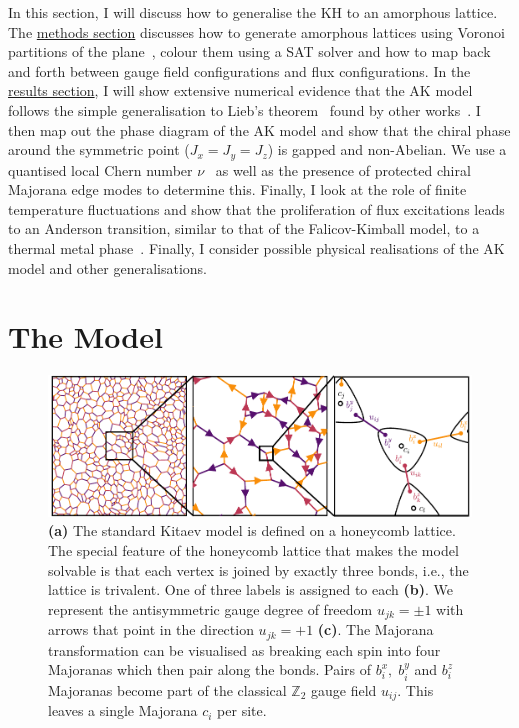 In this section, I will discuss how to generalise the KH to an amorphous lattice. The \protect\hyperlink{amk-methods}{methods section} discusses how to generate amorphous lattices using Voronoi partitions of the plane~\autocite{mitchellAmorphousTopologicalInsulators2018,marsalTopologicalWeaireThorpeModels2020}, colour them using a SAT solver and how to map back and forth between gauge field configurations and flux configurations. In the \protect\hyperlink{amk-results}{results section}, I will show extensive numerical evidence that the AK model follows the simple generalisation to Lieb's theorem~\autocite{lieb_flux_1994} found by other works~\autocite{eschmannThermodynamicClassificationThreedimensional2020,Yao2009,eschmann2019thermodynamics,Peri2020}. I then map out the phase diagram of the AK model and show that the chiral phase around the symmetric point (\(J_x = J_y = J_z\)) is gapped and non-Abelian. We use a quantised local Chern number \(\nu\)~\autocite{peru_preprint,mitchellAmorphousTopologicalInsulators2018} as well as the presence of protected chiral Majorana edge modes to determine this. Finally, I look at the role of finite temperature fluctuations and show that the proliferation of flux excitations leads to an Anderson transition, similar to that of the Falicov-Kimball model, to a thermal metal phase~\autocite{Laumann2012,lahtinenTopologicalLiquidNucleation2012,selfThermallyInducedMetallic2019}. Finally, I consider possible physical realisations of the AK model and other generalisations.

\hypertarget{amk-Model}{%
\section{The Model}\label{amk-Model}}

\hypertarget{fig:amk-zoom}{%
\begin{figure}
\centering
\includegraphics[width=1\textwidth,height=\textheight]{figure_code/amk_chapter/intro/amk_zoom/amk_zoom_by_hand}
\caption[{The Kitaev Honeycomb Model}]{\textbf{(a)} The standard Kitaev model is defined on a honeycomb lattice. The special feature of the honeycomb lattice that makes the model solvable is that each vertex is joined by exactly three bonds, i.e., the lattice is trivalent. One of three labels is assigned to each \textbf{(b)}. We represent the antisymmetric gauge degree of freedom \(u_{jk} = \pm 1\) with arrows that point in the direction \(u_{jk} = +1\) \textbf{(c)}. The Majorana transformation can be visualised as breaking each spin into four Majoranas which then pair along the bonds. Pairs of \(b_i^x,\;b_i^y\) and \(b_i^z\) Majoranas become part of the classical \(\mathbb{Z}_2\) gauge field \(u_{ij}\). This leaves a single Majorana \(c_i\) per site.}
\label{fig:amk-zoom}
\end{figure}
}

